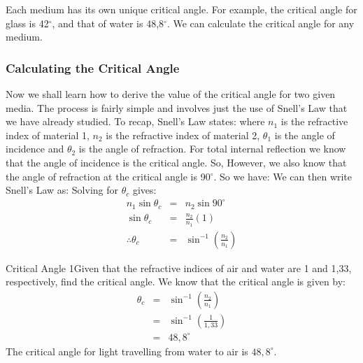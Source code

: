 Each medium has its own unique critical angle. For example, the critical angle for glass is 42$^{\circ}$, and that of water is 48,8$^{\circ}$. We can calculate the critical angle for any medium.


\subsubsection{Calculating the Critical Angle}
Now we shall learn how to derive the value of the critical angle for two given media. The process is fairly simple and involves just the use of Snell's Law that we have already studied. To recap, Snell's Law states:
where $n_1$ is the refractive index of material 1, $n_2$ is the refractive index of material 2, $\theta_1$ is the angle of incidence and $\theta_2$ is the angle of refraction. For total internal reflection we know that the angle of incidence is the critical angle. So,
However, we also know that the angle of refraction at the critical angle is 90$^{\circ}$. So we have:
We can then write Snell's Law as:
Solving for $\theta_c$ gives:
\begin{eqnarray*}
n_1 \sin{\theta_c} &=& n_2 \sin{90^{\circ}}\\
\sin{\theta_c} &=& \frac{n_2}{n_1}(1)\\
\therefore \theta_c &=&\sin^{-1}{(\frac{n_2}{n_1})}
\end{eqnarray*}


\begin{wex}{Critical Angle 1}{Given that the refractive indices of air and water are 1 and 1,33, respectively, find the critical angle.}{
We know that the critical angle is given by:
\begin{eqnarray*}
\theta_c &=&\sin^{-1}{(\frac{n_2}{n_1})}\\
&=&\sin^{-1}{(\frac{1}{1,33})}\\
&=&48,8^{\circ}
\end{eqnarray*}
The critical angle for light travelling from water to air is $48,8^{\circ}$.
}
\end{wex}

